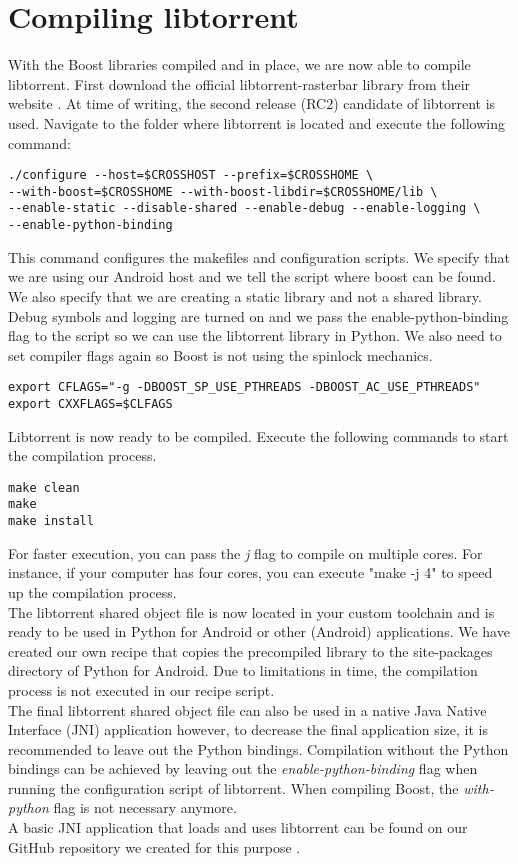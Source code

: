 \section{Compiling libtorrent}
	With the Boost libraries compiled and in place, we are now able to compile libtorrent. First download the official libtorrent-rasterbar library from their website \cite{libtorrentrasterbar}. At time of writing, the second release (RC2) candidate of libtorrent is used. Navigate to the folder where libtorrent is located and execute the following command:
	\begin{lstlisting}
./configure --host=$CROSSHOST --prefix=$CROSSHOME \
--with-boost=$CROSSHOME --with-boost-libdir=$CROSSHOME/lib \
--enable-static --disable-shared --enable-debug --enable-logging \
--enable-python-binding
	\end{lstlisting}
	This command configures the makefiles and configuration scripts. We specify that we are using our Android host and we tell the script where boost can be found. We also specify that we are creating a static library and not a shared library. Debug symbols and logging are turned on and we pass the enable-python-binding flag to the script so we can use the libtorrent library in Python. We also need to set compiler flags again so Boost is not using the spinlock mechanics.
	\begin{lstlisting}
export CFLAGS="-g -DBOOST_SP_USE_PTHREADS -DBOOST_AC_USE_PTHREADS"
export CXXFLAGS=$CLFAGS
	\end{lstlisting}
	Libtorrent is now ready to be compiled. Execute the following commands to start the compilation process.
	\begin{lstlisting}
make clean
make
make install
	\end{lstlisting}
	For faster execution, you can pass the \emph{j} flag to compile on multiple cores. For instance, if your computer has four cores, you can execute "make -j 4" to speed up the compilation process.\\
	The libtorrent shared object file is now located in your custom toolchain and is ready to be used in Python for Android or other (Android) applications. We have created our own recipe that copies the precompiled library to the site-packages directory of Python for Android. Due to limitations in time, the compilation process is not executed in our recipe script.\\
	The final libtorrent shared object file can also be used in a native Java Native Interface (JNI) application however, to decrease the final application size, it is recommended to leave out the Python bindings. Compilation without the Python bindings can be achieved by leaving out the \emph{enable-python-binding} flag when running the configuration script of libtorrent. When compiling Boost, the \emph{with-python} flag is not necessary anymore.\\
	A basic JNI application that loads and uses libtorrent can be found on our GitHub repository we created for this purpose \cite{hellolibtorrentgithub}.